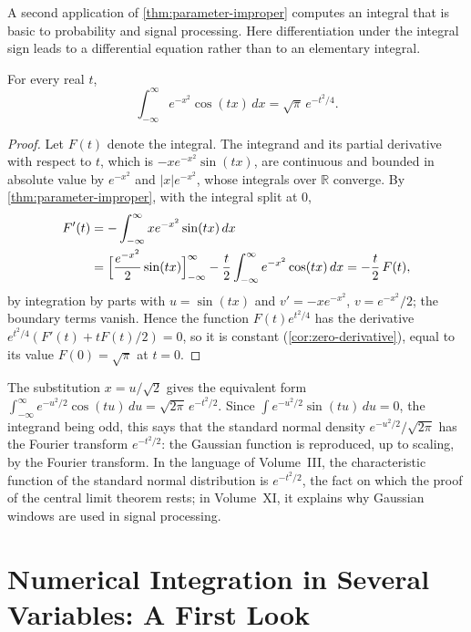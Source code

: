A second application of \cref{thm:parameter-improper} computes an integral that is basic to probability and signal processing. Here differentiation under the integral sign leads to a differential equation rather than to an elementary integral.

\begin{proposition}
\label{prop:gaussian-fourier}
For every real $t$,
\[
\int_{-\infty}^\infty e^{-x^2}\cos(tx)\,dx=\sqrt\pi\,e^{-t^2/4} .
\]
\end{proposition}

\begin{proof}
Let $F(t)$ denote the integral. The integrand and its partial derivative with respect to $t$, which is $-xe^{-x^2}\sin(tx)$, are continuous and bounded in absolute value by $e^{-x^2}$ and $|x|e^{-x^2}$, whose integrals over $\mathbb R$ converge. By \cref{thm:parameter-improper}, with the integral split at $0$,
\[
\begin{aligned}
F'(t)&=-\int_{-\infty}^\infty xe^{-x^2}\sin(tx)\,dx\\
&=\Bigl[\frac{e^{-x^2}}2\sin(tx)\Bigr]_{-\infty}^\infty-\frac t2\int_{-\infty}^\infty e^{-x^2}\cos(tx)\,dx=-\frac t2\,F(t),
\end{aligned}
\]
by integration by parts with $u=\sin(tx)$ and $v'=-xe^{-x^2}$, $v=e^{-x^2}/2$; the boundary terms vanish. Hence the function $F(t)e^{t^2/4}$ has the derivative $e^{t^2/4}(F'(t)+tF(t)/2)=0$, so it is constant (\cref{cor:zero-derivative}), equal to its value $F(0)=\sqrt\pi$ at $t=0$.
\end{proof}

The substitution $x=u/\sqrt2$ gives the equivalent form $\int_{-\infty}^\infty e^{-u^2/2}\cos(tu)\,du=\sqrt{2\pi}\,e^{-t^2/2}$. Since $\int e^{-u^2/2}\sin(tu)\,du=0$, the integrand being odd, this says that the standard normal density $e^{-u^2/2}/\sqrt{2\pi}$ has the Fourier transform $e^{-t^2/2}$: the Gaussian function is reproduced, up to scaling, by the Fourier transform. In the language of Volume~III, the characteristic function of the standard normal distribution is $e^{-t^2/2}$, the fact on which the proof of the central limit theorem rests; in Volume~XI, it explains why Gaussian windows are used in signal processing.

\section{Numerical Integration in Several Variables: A First Look}
\label{sec:cubature}

